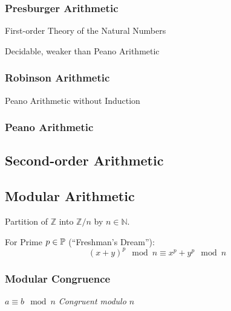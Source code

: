 \subsubsection{Presburger Arithmetic}\label{sec:presburger_arithmetic}

First-order Theory of the Natural Numbers

Decidable, weaker than Peano Arithmetic



\subsubsection{Robinson Arithmetic}\label{sec:robinson_arithmetic}

Peano Arithmetic without Induction



\subsubsection{Peano Arithmetic}\label{sec:peano_arithmetic}



\subsection{Second-order Arithmetic}\label{sec:second_order_arithmetic}

\subsection{Modular Arithmetic}\label{sec:modular_arithmetic}

Partition of $\mathbb{Z}$ into $\mathbb{Z}/n$ by $n \in \mathbb{N}$.

For Prime $p \in \mathbb{P}$ (``Freshman's Dream''):
\[
  (x+y)^p \mod n \equiv x^p + y^p \mod n
\]



\subsubsection{Modular Congruence}\label{sec:modular_congruence}

$a \equiv b \mod n$ \emph{Congruent modulo $n$}

